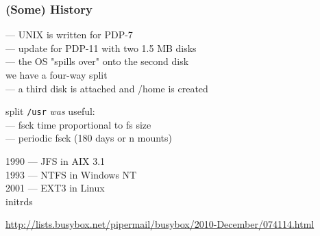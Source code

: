 \documentclass[]{beamer}
\begin{document}
\begin{frame}
  \frametitle{(Some) History}

   — \textsc{\small UNIX} is written for PDP-7\\
   — update for PDP-11 with two 1.5 MB disks\\
  \pause
  \phantom{1670} — the OS "spills over" onto the second disk\\
  \phantom{1670 —} we have a four-way split\\
  \pause
  \phantom{1670} — a third disk is attached and /home is created\\
  \pause

  split \texttt{/usr} \textit{was} useful:\\
  \pause
  \phantom{1670} — fsck time proportional to fs size\\
  \phantom{1670} — periodic fsck (180 days or n mounts)\\
  \pause

  1990 — JFS in AIX 3.1\\
  1993 — NTFS in Windows NT\\
  2001 — EXT3 in Linux\\

  \pause
  initrds

  \vfill

  \tiny
  \url{http://lists.busybox.net/pipermail/busybox/2010-December/074114.html}\vspace{-5em}
\end{frame}
\end{document}
